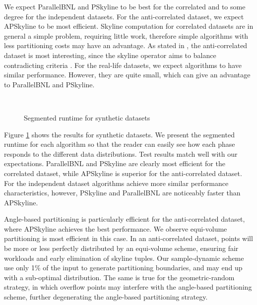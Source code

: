 \documentclass[12pt,a4paper,twoside]{report}
\begin{document}
We expect ParallelBNL and PSkyline to be best for the correlated
and to some degree for the independent datasets. For the
anti-correlated dataset, we expect APSkyline to be most
efficient. Skyline computation for correlated datasets are in
general a simple problem, requiring little work, therefore simple
algorithms with less partitioning costs may have an advantage. As
stated in \cite{vlachou2008angle}, the anti-correlated dataset is
most interesting, since the skyline operator aims to balance
contradicting criteria \cite{morse2007efficient,vlachou2008angle}.
For the real-life datasets, we expect algorithms to have similar
performance. However, they are quite small, which can give an
advantage to ParallelBNL and PSkyline.

\begin{figure}[H]
	\centering
		 \\
	\caption{Segmented runtime for synthetic datasets}
	\label{fig:test-distribution-syntetic}
\end{figure}

Figure \ref{fig:test-distribution-syntetic} shows the results for
synthetic datasets. We present the segmented runtime for each
algorithm so that the reader can easily see how each phase responds to
the different data distributions. Test results match well with our
expectations. ParallelBNL and PSkyline are clearly most efficient for
the correlated dataset, while APSkyline is superior for the
anti-correlated dataset. For the independent dataset algorithms
achieve more similar performance characteristics, however, PSkyline
and ParallelBNL are noticeably faster than APSkyline.

Angle-based partitioning is particularly efficient for the
anti-correlated dataset, where APSkyline achieves the best
performance. We observe equi-volume partitioning is most efficient in
this case. In an anti-correlated dataset, points will be more or less
perfectly distributed by an equi-volume scheme, ensuring fair
workloads and early elimination of skyline tuples. Our sample-dynamic
scheme use only 1\% of the input to generate partitioning boundaries,
and may end up with a sub-optimal distribution. The same is true for
the geometric-random strategy, in which overflow points may interfere
with the angle-based partitioning scheme, further degenerating the
angle-based partitioning strategy.
\end{document}
